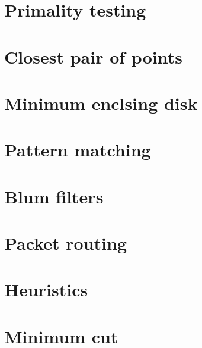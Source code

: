 \documentclass{book}
\begin{document}
\section{Primality testing}
\section{Closest pair of points}
\section{Minimum enclsing disk}
\section{Pattern matching}
\section{Blum filters}
\section{Packet routing} 
\section{Heuristics}
\section{Minimum cut}


\nocite{*}

\newpage


\end{document}
